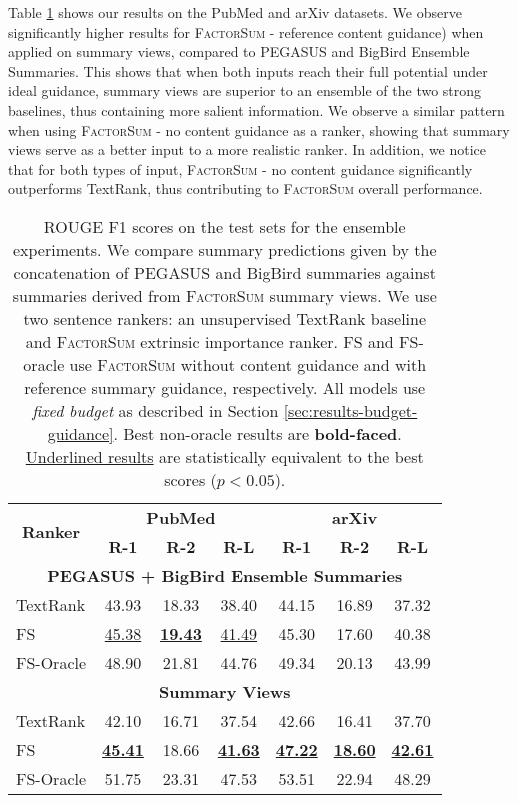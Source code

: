 \documentclass[11pt,table]{article}
\newcommand{\modelname}{FactorSum}
\begin{document}
Table \ref{tab:ablation_study} shows our results on the PubMed and arXiv datasets. We observe significantly higher results for \textsc{\modelname} - reference content guidance) when applied on summary views, compared to PEGASUS and BigBird Ensemble Summaries. This shows that when both inputs reach their full potential under ideal guidance, summary views are superior to an ensemble of the two strong baselines, thus containing more salient information. We observe a similar pattern when using \textsc{\modelname} - no content guidance as a ranker, showing that summary views serve as a better input to a more realistic ranker. In addition, we notice that for both types of input,  \textsc{\modelname} - no content guidance significantly outperforms TextRank, thus contributing to \textsc{\modelname} overall performance. 

\begin{table}
  \centering
  \setlength\tabcolsep{1.5pt}
  \begin{tabular}{l|ccc|ccc}
    \toprule
    \multicolumn{1}{c|}{\multirow{2}{1.2cm}{\centering \textbf{Ranker}}} &  \multicolumn{3}{c|}{\textbf{PubMed}} & \multicolumn{3}{c}{\textbf{arXiv}} \\
    \cmidrule(r){2-4} \cmidrule(r){5-7} & \textbf{R-1} & \textbf{R-2} & \textbf{R-L} & \textbf{R-1} & \textbf{R-2} & \textbf{R-L} \\
    \toprule
    \multicolumn{7}{c}{\textbf{PEGASUS + BigBird Ensemble Summaries}} \\
    \midrule
    TextRank & 43.93 & 18.33 & 38.40 & 44.15 & 16.89 & 37.32 \\
    \midrule
    FS & \underline{45.38} & \underline{\textbf{19.43}} & \underline{41.49} & 45.30 & 17.60 & 40.38 \\
    FS-Oracle & 48.90 & 21.81 & 44.76 & 49.34 & 20.13 & 43.99 \\
    \midrule
    \multicolumn{7}{c}{\textbf{Summary Views}} \\
    \midrule
    TextRank & 42.10 & 16.71 & 37.54 & 42.66 & 16.41 & 37.70 \\
    \midrule
    FS & \underline{\textbf{45.41}} & 18.66 & \underline{\textbf{41.63}} & \underline{\textbf{47.22}} & \underline{\textbf{18.60}} & \underline{\textbf{42.61}} \\
    FS-Oracle & 51.75 & 23.31 & 47.53 & 53.51 & 22.94 & 48.29 \\
    \bottomrule
  \end{tabular}
  \caption{ROUGE F1 scores on the test sets for the ensemble experiments. We compare summary predictions given by the concatenation of PEGASUS and BigBird summaries against summaries derived from \textsc{\modelname} summary views. We use two sentence rankers: an unsupervised TextRank baseline and \textsc{\modelname} extrinsic importance ranker. FS and FS-oracle use \textsc{\modelname} without content guidance and with reference summary guidance, respectively. All models use \emph{fixed budget} as described in Section \ref{sec:results-budget-guidance}. Best non-oracle results are \textbf{bold-faced}. \underline{Underlined results} are statistically equivalent to the best scores ($p<0.05$).}\label{tab:ablation_study}
\end{table}
\end{document}
